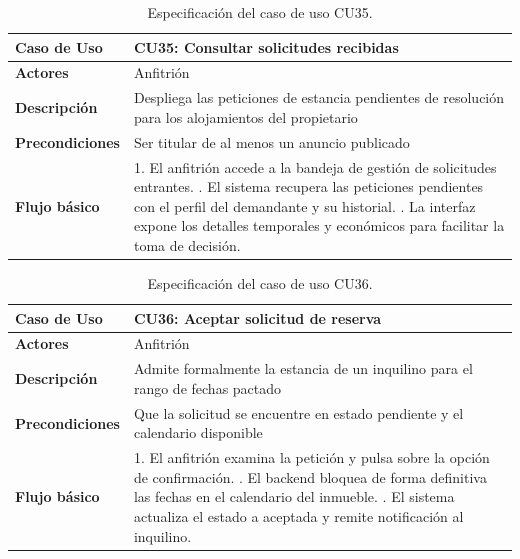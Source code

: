 \begin{table}[H]
\centering
\begin{tabular}{|p{3.2cm}|p{11.3cm}|}
\hline
\textbf{Caso de Uso} & \textbf{CU35: Consultar solicitudes recibidas} \\ \hline
\textbf{Actores} & Anfitrión \\ \hline
\textbf{Descripción} & Despliega las peticiones de estancia pendientes de resolución para los alojamientos del propietario \\ \hline
\textbf{Precondiciones} & Ser titular de al menos un anuncio publicado \\ \hline
\textbf{Flujo básico} & 
1. El anfitrión accede a la bandeja de gestión de solicitudes entrantes. \newline
2. El sistema recupera las peticiones pendientes con el perfil del demandante y su historial. \newline
3. La interfaz expone los detalles temporales y económicos para facilitar la toma de decisión. \\ \hline
\end{tabular}
\caption{Especificación del caso de uso CU35.}
\label{tab:cu35}
\end{table}

\begin{table}[H]
\centering
\begin{tabular}{|p{3.2cm}|p{11.3cm}|}
\hline
\textbf{Caso de Uso} & \textbf{CU36: Aceptar solicitud de reserva} \\ \hline
\textbf{Actores} & Anfitrión \\ \hline
\textbf{Descripción} & Admite formalmente la estancia de un inquilino para el rango de fechas pactado \\ \hline
\textbf{Precondiciones} & Que la solicitud se encuentre en estado pendiente y el calendario disponible \\ \hline
\textbf{Flujo básico} & 
1. El anfitrión examina la petición y pulsa sobre la opción de confirmación. \newline
2. El backend bloquea de forma definitiva las fechas en el calendario del inmueble. \newline
3. El sistema actualiza el estado a aceptada y remite notificación al inquilino. \\ \hline
\end{tabular}
\caption{Especificación del caso de uso CU36.}
\label{tab:cu36}
\end{table}

